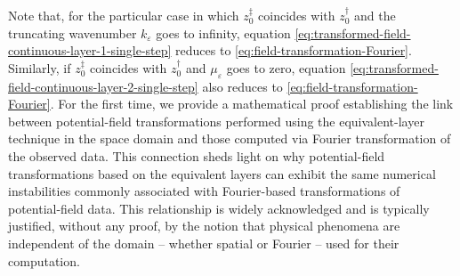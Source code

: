 Note that, for the particular case in which $z^{\ddagger}_{0}$ coincides with $z^{\dagger}_{0}$ and 
the truncating wavenumber $k_{\varepsilon}$ goes to infinity, equation 
\ref{eq:transformed-field-continuous-layer-1-single-step} reduces to \ref{eq:field-transformation-Fourier}.
Similarly, if $z^{\ddagger}_{0}$ coincides with $z^{\dagger}_{0}$ and $\mu_{\varepsilon}$ goes to zero,
equation \ref{eq:transformed-field-continuous-layer-2-single-step} also reduces to \ref{eq:field-transformation-Fourier}.
For the first time, we provide a mathematical proof establishing the link between
potential-field transformations performed using the equivalent-layer technique in 
the space domain and those computed via Fourier transformation of the observed data.
This connection sheds light on why potential-field transformations based on the
equivalent layers can exhibit the same numerical instabilities commonly associated
with Fourier-based transformations of potential-field data. This
relationship is widely acknowledged and is typically justified, without any proof, by  
the notion that physical phenomena are independent of the domain 
-- whether spatial or Fourier -- used for their computation.